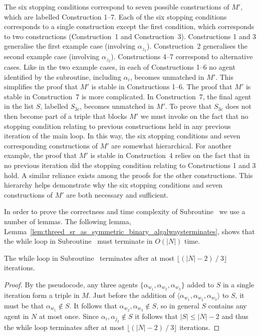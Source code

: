 The six stopping conditions correspond to seven possible constructions of $M'$, which are labelled Construction 1--7. Each of the six stopping conditions corresponds to a single construction except the first condition, which corresponds to two constructions (Construction~1 and Construction~3).
Constructions 1 and 3 generalise the first example case (involving $\alpha_{z_1}$). Construction~2 generalises the second example case (involving $\alpha_{z_2}$). Constructions 4--7 correspond to alternative cases. 
Like in the two example cases, in each of Constructions 1--6 no agent identified by the subroutine, including $\alpha_i$, becomes unmatched in $M'$. This simplifies the proof that $M'$ is stable in Constructions 1--6. The proof that $M'$ is stable in Construction~7 is more complicated. In Construction~7, the final agent in the list $S$, labelled $S_{3c}$, becomes unmatched in $M'$. To prove that $S_{3c}$ does not then become part of a triple that blocks $M'$ we must invoke on the fact that no stopping condition relating to previous constructions held in any previous iteration of the main loop. In this way, the six stopping conditions and seven corresponding constructions of $M'$ are somewhat hierarchical. For another example, the proof that $M'$ is stable in Construction~4 relies on the fact that in no previous iteration did the stopping condition relating to Constructions 1 and 3 hold. A similar reliance exists among the proofs for the other constructions. This hierarchy helps demonstrate why the six stopping conditions and seven constructions of $M'$ are both necessary and sufficient. 

In order to prove the correctness and time complexity of Subroutine~ we use a number of lemmas. The following lemma, Lemma~\ref{lem:threed_sr_as_symmetric_binary_algalwaysterminates}, shows that the while loop in Subroutine~ must terminate in $O(|N|)$ time.

\begin{lem}
\label{lem:threed_sr_as_symmetric_binary_algalwaysterminates}
The while loop in Subroutine~ terminates after at most $\lfloor (|N|-2) \mathbin{/} 3 \rfloor$ iterations.
\end{lem}
\begin{proof}
By the pseudocode, any three agents $\{ \alpha_{w_1}, \alpha_{w_2}, \alpha_{w_3} \}$ added to $S$ in a single iteration form a triple in $M$. Just before the addition of $\langle \alpha_{w_1}, \alpha_{w_2}, \alpha_{w_3} \rangle$ to $S$, it must be that $\alpha_{w_1} \notin S$. It follows that $\alpha_{w_2}, \alpha_{w_3} \notin S$, so in general $S$ contains any agent in $N$ at most once. Since $\alpha_i, \alpha_{j_2} \notin S$ it follows that $|S|\leq |N| - 2$ and thus the while loop terminates after at most $\lfloor (|N|-2) \mathbin{/} 3 \rfloor$ iterations.
\end{proof}

